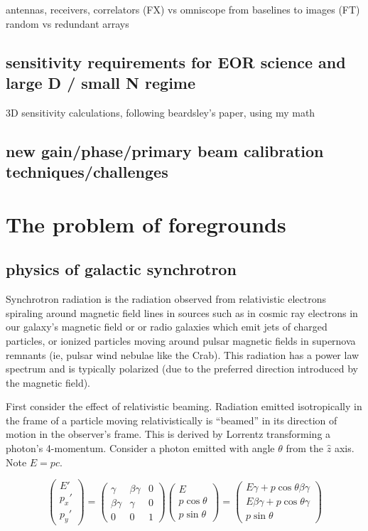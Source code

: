 antennas, receivers, correlators (FX) vs omniscope
from baselines to images (FT)
random vs redundant arrays

\subsection{sensitivity requirements for EOR science and large D / small N regime}

3D sensitivity calculations, following beardsley's paper, using my math

\subsection{new gain/phase/primary beam calibration techniques/challenges}


\section{The problem of foregrounds}

\subsection{physics of galactic synchrotron}

Synchrotron radiation is the radiation observed from relativistic electrons spiraling around magnetic field lines in sources such as in cosmic ray electrons in our galaxy's magnetic field or  or radio galaxies which emit jets of charged particles, or ionized particles moving around pulsar magnetic fields in supernova remnants (ie, pulsar wind nebulae like the Crab). This radiation has a power law spectrum and is typically polarized (due to the preferred direction introduced by the magnetic field). 

First consider the effect of relativistic beaming. Radiation emitted isotropically in the frame of a particle moving relativistically is ``beamed'' in its direction of motion in the observer's frame. This is derived by Lorrentz transforming a photon's 4-momentum. Consider a photon emitted with angle $\theta$ from the $\hat{z}$ axis. Note $E=pc$.

\begin{equation}
\left(\begin{matrix}
E'\\
p_x'\\
p_y'
\end{matrix}\right)=
\left(\begin{matrix}
\gamma&\beta\gamma& 0\\
\beta\gamma&\gamma &0\\
0&0 &1
\end{matrix}\right)
\left(\begin{matrix}
E\\
p\cos\theta\\
p\sin\theta
\end{matrix}\right)=
\left(\begin{matrix}
E\gamma+p\cos\theta\beta\gamma\\
E\beta\gamma+p\cos\theta\gamma\\
p\sin\theta
\end{matrix}\right)
\end{equation}

